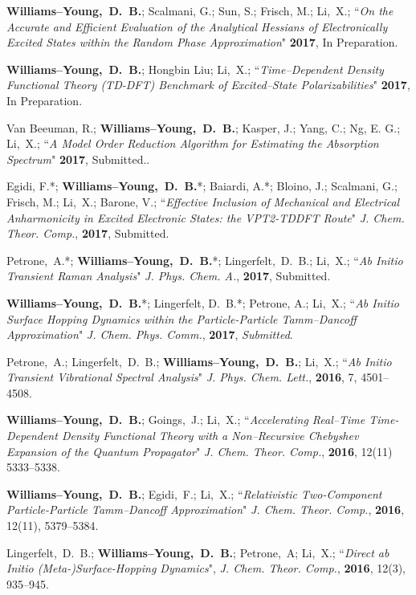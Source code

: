 \documentclass[10pt]{res} %
\newcommand*\me[0]{{\bf Williams--Young,~D.~B.}}
\newcommand*\xsli[0]{Li,~X.}
\begin{document}
\begin{resume}
\vspace{10pt} %
\begin{etaremune}
  \item \me; Scalmani, G.; Sun, S.; Frisch, M.; \xsli;
        ``\emph{On the Accurate and Efficient Evaluation of the 
	        Analytical Hessians of Electronically Excited States 
		within the Random Phase Approximation}"
        \textbf{2017}, In Preparation.
  \item \me; Hongbin Liu; \xsli;
        ``\emph{Time--Dependent Density Functional Theory (TD-DFT) Benchmark
	        of Excited--State Polarizabilities}"
        \textbf{2017}, In Preparation.
  \item Van Beeuman, R.; \me; Kasper, J.; Yang, C.; Ng, E. G.; \xsli;
        ``\emph{A Model Order Reduction Algorithm for Estimating the 
	        Absorption Spectrum}"
        \textbf{2017}, Submitted..
  \item Egidi, F.*; \me*; Baiardi, A.*; Bloino, J.; Scalmani, G.; Frisch, M.; 
        \xsli; Barone, V.; 
        ``\emph{Effective Inclusion of Mechanical and Electrical Anharmonicity in 
                Excited Electronic States: the VPT2-TDDFT Route}"
          \emph{J. Chem. Theor. Comp.}, \textbf{2017}, Submitted.
  \item Petrone,~A.*; \me*; Lingerfelt,~D.~B.; \xsli;
        ``\emph{Ab Initio Transient Raman Analysis}"
	  \emph{J. Phys. Chem. A.}, \textbf{2017}, Submitted.
  \item \me*; Lingerfelt, D.~B.*; Petrone, A.; \xsli;
	``\emph{Ab Initio Surface Hopping Dynamics within the Particle-Particle 
	        Tamm--Dancoff Approximation}"
          \emph{J. Chem. Phys. Comm.}, \textbf{2017}, \emph{Submitted}.
  \item Petrone,~A.; Lingerfelt,~D.~B.; \me; \xsli;
        ``\emph{Ab Initio Transient Vibrational Spectral Analysis}"
	  \emph{J. Phys. Chem. Lett.}, \textbf{2016}, 7, 4501--4508.
  \item \me; Goings,~J.; \xsli;
	``\emph{Accelerating Real--Time Time-Dependent Density Functional Theory 
	        with a Non--Recursive Chebyshev Expansion of the Quantum 
                Propagator}"
	  \emph{J. Chem. Theor. Comp.}, \textbf{2016}, 12(11) 5333--5338.
  \item \me; Egidi,~F.; \xsli;
	``\emph{Relativistic Two-Component Particle-Particle Tamm--Dancoff 
	        Approximation}"
	  \emph{J. Chem. Theor. Comp.}, \textbf{2016}, 12(11), 5379--5384.
  \item Lingerfelt,~D.~B.; \me; Petrone,~A; \xsli; 
        ``\emph{Direct ab Initio (Meta-)Surface-Hopping Dynamics}", 
        \emph{J. Chem. Theor. Comp.}, \textbf{2016}, 12(3), 935--945.
\end{etaremune}
%


\end{resume}
\end{document}
